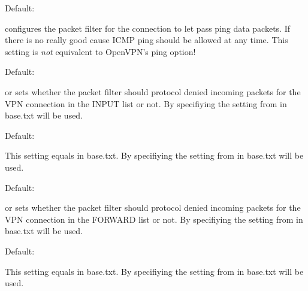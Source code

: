 \begin{description}

  Default: 

   configures the packet filter for the connection to let 
  pass ping data packets. If there is no really good cause ICMP ping 
  should be allowed at any time. This setting is \emph{not} equivalent 
  to OpenVPN's ping option!


  Default: 

   or  sets whether the packet filter should protocol 
  denied incoming packets for the VPN connection in the INPUT list or not. 
  By specifiying  the setting from  in 
  base.txt will be used.


  Default: 

  This setting equals 
  in base.txt. By specifiying  the setting from   
  in base.txt will be used.
  

  Default: 

   or  sets whether the packet filter should protocol 
  denied incoming packets for the VPN connection in the FORWARD list or not. 
  By specifiying  the setting from  in 
  base.txt will be used.


  Default: 

  This setting equals  
  in base.txt. By specifiying  the setting from  in 
  base.txt will be used.



\end{description}
